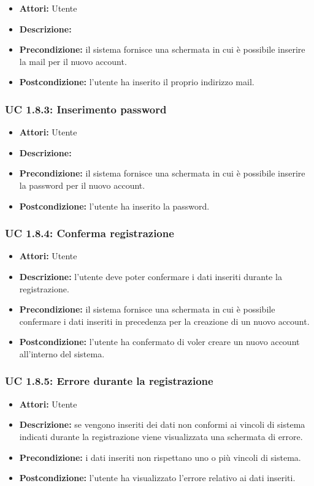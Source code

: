 \begin{itemize}
    \item \textbf{Attori:} Utente
    \item \textbf{Descrizione:}
    \item \textbf{Precondizione:} il sistema fornisce una schermata in cui è possibile inserire la mail per il nuovo account.
    \item \textbf{Postcondizione:} l'utente ha inserito il proprio indirizzo mail.
\end{itemize}

\subsubsection{UC 1.8.3: Inserimento password}

\begin{itemize}
    \item \textbf{Attori:} Utente
    \item \textbf{Descrizione:}
    \item \textbf{Precondizione:} il sistema fornisce una schermata in cui è possibile inserire la password per il nuovo account.
    \item \textbf{Postcondizione:} l'utente ha inserito la password.
\end{itemize}

\subsubsection{UC 1.8.4: Conferma registrazione}

\begin{itemize}
    \item \textbf{Attori:} Utente
    \item \textbf{Descrizione:} l'utente deve poter confermare i dati inseriti durante la registrazione.
    \item \textbf{Precondizione:} il sistema fornisce una schermata in cui è possibile confermare i dati inseriti in precedenza per la creazione di un nuovo account.
    \item \textbf{Postcondizione:} l'utente ha confermato di voler creare un nuovo account all'interno
    del sistema.
\end{itemize}

\subsubsection{UC 1.8.5: Errore durante la registrazione}

\begin{itemize}
    \item \textbf{Attori:} Utente
    \item \textbf{Descrizione:} se vengono inseriti dei dati non conformi ai vincoli di sistema indicati durante la registrazione viene visualizzata una schermata di errore.
    \item \textbf{Precondizione:} i dati inseriti non rispettano uno o più vincoli di sistema.
    \item \textbf{Postcondizione:} l'utente ha visualizzato l'errore relativo ai dati inseriti.
\end{itemize}
